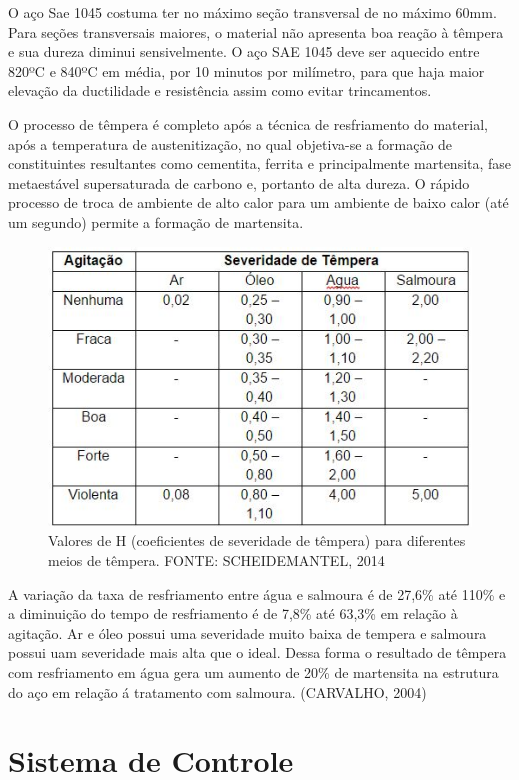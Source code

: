 O aço Sae 1045 costuma ter no máximo seção transversal de no máximo 60mm. Para seções transversais maiores, o material não apresenta boa reação à têmpera e sua dureza diminui sensivelmente. O aço SAE 1045 deve ser aquecido entre 820ºC e 840ºC em média, por 10 minutos por milímetro, para que haja maior elevação da ductilidade e resistência assim como evitar trincamentos.

O processo de têmpera é completo após a técnica de resfriamento do material, após a temperatura de austenitização, no qual objetiva-se a formação de constituintes resultantes como cementita, ferrita e principalmente martensita, fase metaestável supersaturada de carbono e, portanto de alta dureza. O rápido processo de troca de ambiente de alto calor para um ambiente de baixo calor (até um segundo) permite a formação de martensita.

\begin{figure}[!h]
	\centering
	\label{tab_valoresH}
	\includegraphics[keepaspectratio=true,scale=0.8]{figuras/tab_valoresH.JPG}
	\caption{Valores de H (coeficientes de severidade de têmpera) para diferentes meios de têmpera. FONTE: SCHEIDEMANTEL, 2014}
\end{figure}

A variação da taxa de resfriamento entre água e salmoura é de 27,6\% até 110\% e a diminuição do tempo de resfriamento é de 7,8\% até 63,3\% em relação à agitação. Ar e óleo possui uma severidade muito baixa de tempera e salmoura possui uam severidade mais alta que o ideal. Dessa forma o resultado de têmpera com resfriamento em água gera um aumento de 20\% de martensita na estrutura do aço em relação á tratamento com salmoura. (CARVALHO, 2004)

\section{Sistema de Controle}

